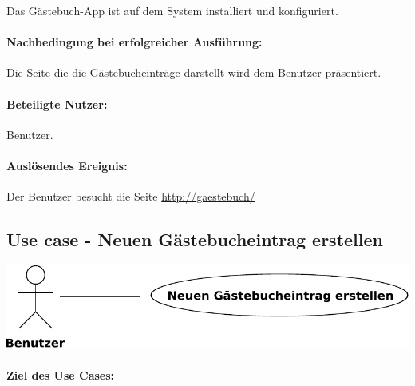 Das Gästebuch-App ist auf dem System installiert und konfiguriert.

\paragraph{Nachbedingung bei erfolgreicher Ausführung:}

\begin{asparaitem}
\item Die Seite die die Gästebucheinträge darstellt wird dem Benutzer präsentiert.
\end{asparaitem}

\paragraph{Beteiligte Nutzer:}

\begin{asparaitem}
\item Benutzer.
\end{asparaitem}

\paragraph{Auslösendes Ereignis:}

\begin{asparaitem}
\item Der Benutzer besucht die Seite \url{http://gaestebuch/}
\end{asparaitem}

\subsection{Use case - Neuen Gästebucheintrag erstellen}

\begin{figurehere}
\includegraphics[width=\columnwidth]{use-case-new_entry}
\end{figurehere}

\paragraph{Ziel des Use Cases:}


